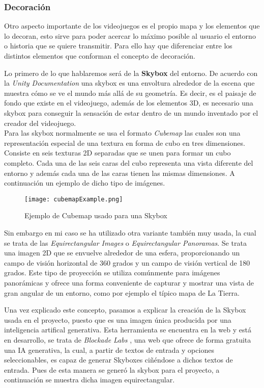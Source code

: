 \subsubsection{Decoración}

Otro aspecto importante de los videojuegos es el propio mapa y los elementos que lo decoran, esto sirve para poder acercar lo máximo posible al usuario 
el entorno o historia que se quiere transmitir. Para ello hay que diferenciar entre los distintos elementos que conforman el concepto de decoración.

Lo primero de lo que hablaremos será de la \textbf{Skybox} del entorno. De acuerdo con la \textit{Unity Documentation} una skybox es una envoltura alrededor de la escena que muestra cómo se ve el mundo más allá de su geometría. Es decir, es el paisaje de fondo que existe en el videojuego, además de los elementos 3D, es necesario una skybox para conseguir la sensación de estar dentro de un mundo inventado por el creador del videojuego.\\

Para las skybox normalmente se usa el formato  \textit{Cubemap} \cite{Cubemaps} las cuales son una representación especial de una textura en forma de cubo en tres dimensiones. Consiste en seis texturas 2D separadas que se unen para formar un cubo completo. Cada una de las seis caras del cubo representa una vista diferente del entorno y además cada una de las caras tienen las mismas dimensiones. A continuación un ejemplo de dicho tipo de imágenes.\\

\begin{figure}[H]
    \centering
    \texttt{[image: cubemapExample.png]}
    \caption{Ejemplo de Cubemap usado para una Skybox}
\end{figure}

Sin embargo en mi caso se ha utilizado otra variante también muy usada, la cual se trata de las \textit{Equirectangular Images} \cite{EquirectangularImages} o \textit{Equirectangular Panoramas}. Se trata una imagen 2D que se envuelve alrededor de una esfera, proporcionando un campo de visión horizontal de 360 grados y un campo de visión vertical de 180 grados. Este tipo de proyección se utiliza comúnmente para imágenes panorámicas y ofrece una forma conveniente de capturar y mostrar una vista de gran angular de un entorno, como por ejemplo el típico mapa de La Tierra.

Una vez explicado este concepto, pasamos a explicar la creación de la Skybox usada en el proyecto, puesto que es una imagen única producida por una inteligencia artifical generativa. Esta herramienta se encuentra en la web y está en desarrollo, se trata de \textit{Blockade Labs} \cite{BlockadeLabs}, una web que ofrece de forma gratuita una IA generativa, la cual, a partir de textos de entrada y opciones seleccionables, es capaz de generar Skyboxes ciñéndose a dichos textos de entrada. Pues de esta manera se generó la skybox para el proyecto, a continuación se muestra dicha imagen equirectangular.

